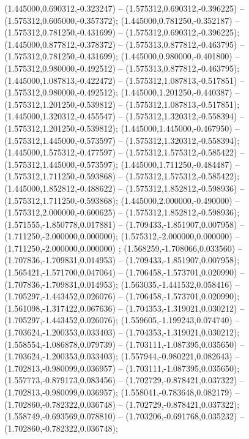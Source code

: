  (1.445000,0.690312,-0.323247) -- (1.575312,0.690312,-0.396225) -- (1.575312,0.605000,-0.357372);
 (1.445000,0.781250,-0.352187) -- (1.575312,0.781250,-0.431699) -- (1.575312,0.690312,-0.396225);
 (1.445000,0.877812,-0.378372) -- (1.575313,0.877812,-0.463795) -- (1.575312,0.781250,-0.431699);
 (1.445000,0.980000,-0.401800) -- (1.575312,0.980000,-0.492512) -- (1.575313,0.877812,-0.463795);
 (1.445000,1.087813,-0.422472) -- (1.575312,1.087813,-0.517851) -- (1.575312,0.980000,-0.492512);
 (1.445000,1.201250,-0.440387) -- (1.575312,1.201250,-0.539812) -- (1.575312,1.087813,-0.517851);
 (1.445000,1.320312,-0.455547) -- (1.575312,1.320312,-0.558394) -- (1.575312,1.201250,-0.539812);
 (1.445000,1.445000,-0.467950) -- (1.575312,1.445000,-0.573597) -- (1.575312,1.320312,-0.558394);
 (1.445000,1.575312,-0.477597) -- (1.575312,1.575312,-0.585422) -- (1.575312,1.445000,-0.573597);
 (1.445000,1.711250,-0.484487) -- (1.575312,1.711250,-0.593868) -- (1.575312,1.575312,-0.585422);
 (1.445000,1.852812,-0.488622) -- (1.575312,1.852812,-0.598936) -- (1.575312,1.711250,-0.593868);
 (1.445000,2.000000,-0.490000) -- (1.575312,2.000000,-0.600625) -- (1.575312,1.852812,-0.598936);
 (1.571555,-1.850778,0.017881) -- (1.709433,-1.851907,0.007958) -- (1.711250,-2.000000,0.000000);
 (1.575312,-2.000000,0.000000) -- (1.711250,-2.000000,0.000000) ;
 (1.568259,-1.708066,0.033560) -- (1.707836,-1.709831,0.014953) -- (1.709433,-1.851907,0.007958);
 (1.565421,-1.571700,0.047064) -- (1.706458,-1.573701,0.020990) -- (1.707836,-1.709831,0.014953);
 (1.563035,-1.441532,0.058416) -- (1.705297,-1.443452,0.026076) -- (1.706458,-1.573701,0.020990);
 (1.561098,-1.317422,0.067636) -- (1.704353,-1.319021,0.030212) -- (1.705297,-1.443452,0.026076);
 (1.559605,-1.199243,0.074740) -- (1.703624,-1.200353,0.033403) -- (1.704353,-1.319021,0.030212);
 (1.558554,-1.086878,0.079739) -- (1.703111,-1.087395,0.035650) -- (1.703624,-1.200353,0.033403);
 (1.557944,-0.980221,0.082643) -- (1.702813,-0.980099,0.036957) -- (1.703111,-1.087395,0.035650);
 (1.557773,-0.879173,0.083456) -- (1.702729,-0.878421,0.037322) -- (1.702813,-0.980099,0.036957);
 (1.558041,-0.783648,0.082179) -- (1.702860,-0.782322,0.036748) -- (1.702729,-0.878421,0.037322);
 (1.558749,-0.693569,0.078810) -- (1.703206,-0.691768,0.035232) -- (1.702860,-0.782322,0.036748);
